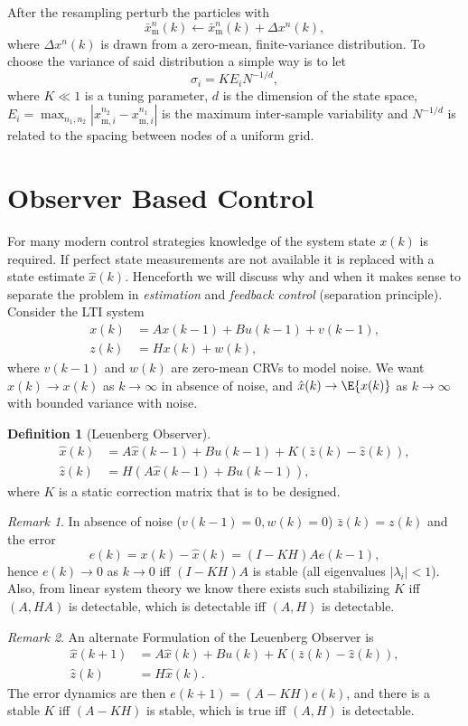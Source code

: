 \documentclass[]{hsrzf}
\theoremstyle{plain}
\theoremstyle{definition}
\newtheorem{defn}{Definition}[section]
\theoremstyle{remark}
\newtheorem*{remark}{Remark}
\begin{document}
After the resampling perturb the particles with
\[
  \bar{x}_\mathrm{m}^n(k) \leftarrow \bar{x}_\mathrm{m}^n(k) + \Delta x^n(k),
\]
where $\Delta x^n(k)$ is drawn from a zero-mean, finite-variance distribution.
To choose the variance of said distribution a simple way is to let
\[
  \sigma_i = K E_i N^{-1/d},
\]
where $K \ll 1$ is a tuning parameter, $d$ is the dimension of the state
space, $E_i = \max_{n_1, n_2} | x_{\mathrm{m},i}^{n_2} -
x_{\mathrm{m},i}^{n_1} |$ is the maximum inter-sample variability and
$N^{-1/d}$ is related to the spacing between nodes of a uniform grid.

\section{Observer Based Control}

For many modern control strategies knowledge of the system state $x(k)$ is
required. If perfect state measurements are not available it is replaced with
a state estimate $\hat{x}(k)$. Henceforth we will discuss why and when it
makes sense to separate the problem in \emph{estimation} and \emph{feedback
control} (separation principle). Consider the LTI system
\begin{align*}
  x(k) &= Ax(k-1) + Bu(k-1) + v(k-1), \\
  z(k) &= Hx(k) + w(k),
\end{align*}
where $v(k-1)$ and $w(k)$ are zero-mean CRVs to model noise. We want
$\hat{x}(k) \to x(k)$ as $k \to \infty$ in absence of noise, and $\hat{x}(k)
\to \E{x(k)}$ as $k \to \infty$ with bounded variance with noise.

\begin{defn}[Leuenberg Observer]
  \begin{align*}
    \hat{x}(k) &= A\hat{x}(k-1) + Bu(k-1) + K(\bar{z}(k) - \hat{z}(k)), \\
    \hat{z}(k) &= H(A\hat{x}(k-1) + Bu(k-1)),
  \end{align*}
  where $K$ is a static correction matrix that is to be designed.
\end{defn}

\begin{remark}
  In absence of noise ($v(k-1) = 0, w(k) = 0$) $\bar{z}(k) = z(k)$ and the
  error
  \[
    e(k) = x(k) - \hat{x}(k) = (I - KH) A e(k-1),
  \]
  hence $e(k) \to 0$ as $k\to 0$ iff $(I - KH)A$ is stable (all eigenvalues
  $|\lambda_i| < 1$). Also, from linear system theory we know there exists
  such stabilizing $K$ iff $(A, HA)$ is detectable, which is detectable iff
  $(A,H)$ is detectable.
\end{remark}
\begin{remark}
  An alternate Formulation of the Leuenberg Observer is
    \begin{align*}
    \hat{x}(k+1) &= A\hat{x}(k) + Bu(k) + K(\bar{z}(k) - \hat{z}(k)), \\
    \hat{z}(k) &= H\hat{x}(k).
  \end{align*}
  The error dynamics are then $e(k+1) = (A-KH) e(k)$, and there is a stable
  $K$ iff $(A-KH)$ is stable, which is true iff $(A,H)$ is detectable.
\end{remark}
\end{document}
